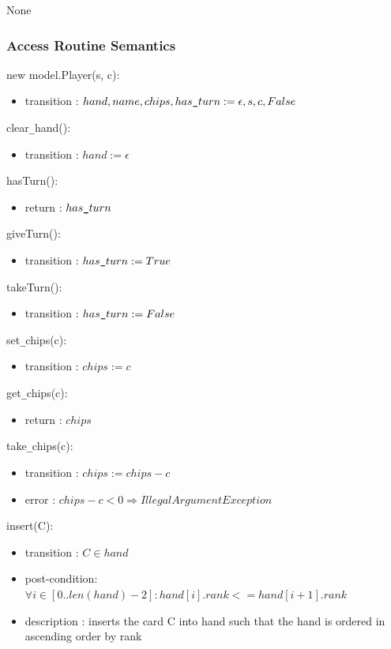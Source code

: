 \documentclass[12pt, titlepage]{article}
\begin{document}
None

\subsubsection* {Access Routine Semantics}

\noindent new model.Player(s, c):
\begin{itemize}
\item transition : $hand, name, chips, has\verb|_|turn := \epsilon, s, c, False$ 
\end{itemize}

\noindent clear\verb|_|hand():
\begin{itemize}
\item transition : $hand := \epsilon$ 
\end{itemize}

\noindent hasTurn():
\begin{itemize}
\item return : $has\verb|_|turn$ 
\end{itemize}

\noindent giveTurn():
\begin{itemize}
\item transition : $has\verb|_|turn := True$ 
\end{itemize}

\noindent takeTurn():
\begin{itemize}
\item transition : $has\verb|_|turn := False$ 
\end{itemize}

\noindent set\verb|_|chips(c):
\begin{itemize}
\item transition : $chips := c$ 
\end{itemize}

\noindent get\verb|_|chips(c):
\begin{itemize}
\item return : $chips$ 
\end{itemize}

\noindent take\verb|_|chips(c):
\begin{itemize}
\item transition : $chips := chips - c$
\item error : $chips - c < 0 \Longrightarrow IllegalArgumentException$
\end{itemize}

\noindent insert(C):
\begin{itemize}
\item transition : $C \in hand$
\item post-condition: $\forall i \in [0..len(hand) - 2] : hand[i].rank <= hand[i+1].rank$ 
\item description : inserts the card C into hand such that the hand is ordered in ascending order by rank
\end{itemize}
\end{document}
